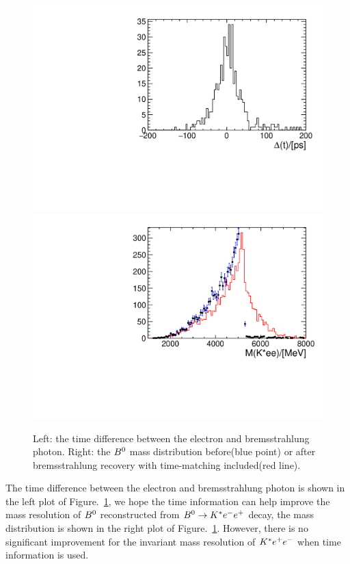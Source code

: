 \begin{figure}[!htbp]
  \begin{center}
    \includegraphics[width=0.49\linewidth]{Figures/06_ECAL/Brem/t_dis.pdf}
    \includegraphics[width=0.49\linewidth]{Figures/06_ECAL/Brem/Bmass_compare.pdf}
    \vspace*{-0.5cm}
  \end{center}
  \caption{
      Left: the time difference between the electron and bremsstrahlung photon.
      Right: the ${{B}^0}$ mass distribution before(blue point) or after bremsstrahlung recovery with time-matching included(red line).
  }
  \label{fig:Brem_B2kee}
\end{figure}

The time difference between the electron and bremsstrahlung photon is shown in the left plot of Figure.~\ref{fig:Brem_B2kee},
we hope the time information can help improve the mass resolution of ${{B}^0}$ reconstructed from ${{B}^0}\rightarrow{\ensuremath{{K}^*}}{\ensuremath{e^-}}{\ensuremath{e^+}}$ decay, 
the mass distribution is shown in the right plot of Figure.~\ref{fig:Brem_B2kee}.
However, 
there is no significant improvement for the invariant mass resolution of ${{K}^*}{e^+}{e^-}$ when time information is used.

 









